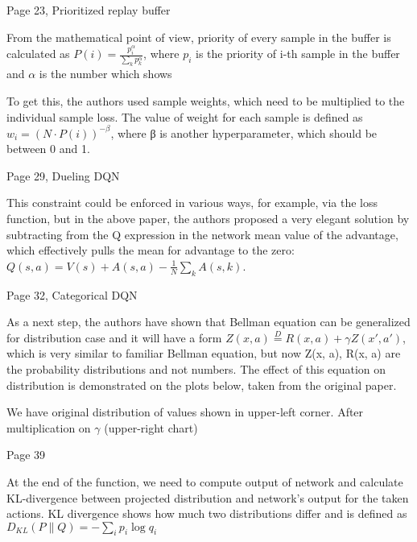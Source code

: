 Page 23, Prioritized replay buffer

From the mathematical point of view, priority of every sample in the buffer is
calculated as \begin{math}P(i) = \frac{p_i^\alpha}{\sum_kp_k^\alpha}\end{math}, where $p_i$ is the priority of i-th sample in the buffer and $\alpha$ is
the number which shows


To get this, the authors used sample weights, which need to be multiplied to the
individual sample loss. The value of weight for each sample is defined as
\begin{math}w_i=(N \cdot P(i))^{-\beta}\end{math},
where β is another hyperparameter, which should be between 0 and 1.

Page 29, Dueling DQN

This constraint could be enforced in various ways, for example, via the loss
function, but in the above paper, the authors proposed a very elegant solution
by subtracting from the Q expression in the network mean value of the advantage,
which effectively pulls the mean for advantage to the zero:
\begin{math}Q(s, a) = V(s) + A(s, a) - \frac{1}{N}\sum_kA(s,k)\end{math}.

Page 32, Categorical DQN

As a next step, the authors have shown that Bellman equation can be generalized for
distribution case and it will have a form
\begin{math}Z(x, a)\stackrel{D}{=} R(x, a) + \gamma Z(x', a')\end{math}, which
is very similar to familiar Bellman equation, but now Z(x, a), R(x, a) are the
probability distributions and not numbers. The effect of this equation on
distribution is demonstrated on the plots below, taken from the original paper.

We have original distribution of values shown in upper-left corner. After
multiplication on \begin{math}\gamma\end{math} (upper-right chart)

Page 39

At the end of the function, we need to compute output of network and calculate
KL-divergence between projected distribution and network’s output for the taken
actions. KL divergence shows how much two distributions differ and is defined as
\begin{math}D_{KL}(P\|Q) = -\sum_i p_i\log q_i\end{math}
  

